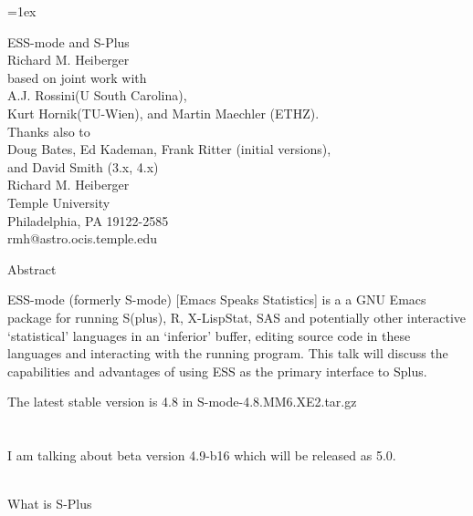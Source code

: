 \documentclass[12pt]{article}   %
\begin{document}
\Huge
\parskip=1ex


\begin{center}
\Huge
ESS-mode and S-Plus\\
Richard M. Heiberger\\[1ex]
based on joint work with\\
A.J. Rossini(U South Carolina),\\
 Kurt Hornik(TU-Wien), and Martin Maechler (ETHZ).\\[2ex]
Thanks also to\\
Doug Bates, Ed Kademan, Frank Ritter (initial versions),\\
and David Smith (3.x, 4.x)\\[3ex]

Richard M. Heiberger\\[.4ex]
Temple University\\[.4ex]
Philadelphia, PA 19122-2585\\[.4ex]
{\sf rmh@astro.ocis.temple.edu}\\[2ex]

\end{center}


\newpage
\begin{center}Abstract\end{center}
ESS-mode (formerly S-mode) [Emacs Speaks Statistics] is a a GNU Emacs
package for running S(plus), R, X-LispStat, SAS and potentially other
interactive `statistical' languages in an `inferior' buffer, editing
source code in these languages and interacting with the running
program.  This talk will discuss the capabilities and advantages of
using ESS as the primary interface to Splus.


The latest stable version is 4.8 in {\sf S-mode-4.8.MM6.XE2.tar.gz}\\
\\
\hspace*{2ex}{\sf ftp://wingra.stat.wisc.edu/pub/src/emacs-lisp/}\\
I am talking about beta version 4.9-b16 which will be released as 5.0.\\
\hspace*{2ex}{\sf http://franz.stat.wisc.edu/pub/ESS/}\\
\hspace*{2ex}{\sf ftp://franz.stat.wisc.edu/pub/ESS/}


\newpage

What is S-Plus
\end{document}
